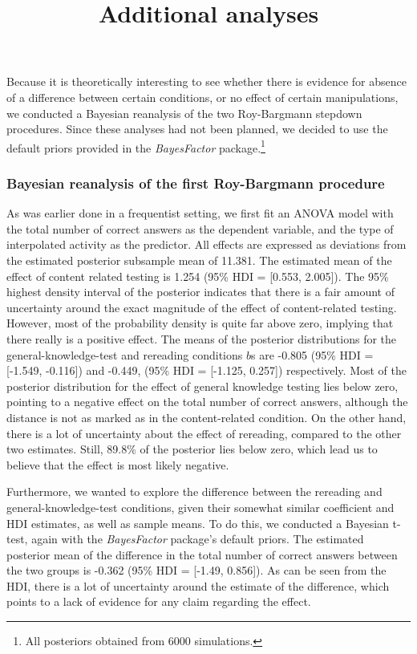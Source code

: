 \documentclass[11pt,]{article}
\title{Additional analyses}
\author{}
\date{}
\let\rmarkdownfootnote\footnote%
\def\footnote{\protect\rmarkdownfootnote}
\begin{document}
\maketitle

Because it is theoretically interesting to see whether there is evidence
for absence of a difference between certain conditions, or no effect of
certain manipulations, we conducted a Bayesian reanalysis of the two
Roy-Bargmann stepdown procedures. Since these analyses had not been
planned, we decided to use the default priors provided in the
\textit{BayesFactor} \citep{moreyBayesFactorComputationBayes2018}
package.\footnote{All posteriors obtained from 6000 simulations.}

\hypertarget{bayesian-reanalysis-of-the-first-roy-bargmann-procedure}{%
\subsubsection{Bayesian reanalysis of the first Roy-Bargmann
procedure}\label{bayesian-reanalysis-of-the-first-roy-bargmann-procedure}}

As was earlier done in a frequentist setting, we first fit an ANOVA
model with the total number of correct answers as the dependent
variable, and the type of interpolated activity as the predictor. All
effects are expressed as deviations from the estimated posterior
subsample mean of 11.381. The estimated mean of the effect of content
related testing is 1.254 (95\% HDI = {[}0.553, 2.005{]}). The 95\%
highest density interval of the posterior indicates that there is a fair
amount of uncertainty around the exact magnitude of the effect of
content-related testing. However, most of the probability density is
quite far above zero, implying that there really is a positive effect.
The means of the posterior distributions for the general-knowledge-test
and rereading conditions \(b\)s are -0.805 (95\% HDI = {[}-1.549,
-0.116{]}) and -0.449, (95\% HDI = {[}-1.125, 0.257{]}) respectively.
Most of the posterior distribution for the effect of general knowledge
testing lies below zero, pointing to a negative effect on the total
number of correct answers, although the distance is not as marked as in
the content-related condition. On the other hand, there is a lot of
uncertainty about the effect of rereading, compared to the other two
estimates. Still, 89.8\% of the posterior lies below zero, which lead us
to believe that the effect is most likely negative.

Furthermore, we wanted to explore the difference between the rereading
and general-knowledge-test conditions, given their somewhat similar
coefficient and HDI estimates, as well as sample means. To do this, we
conducted a Bayesian t-test, again with the \textit{BayesFactor}
package's default priors. The estimated posterior mean of the difference
in the total number of correct answers between the two groups is -0.362
(95\% HDI = {[}-1.49, 0.856{]}). As can be seen from the HDI, there is a
lot of uncertainty around the estimate of the difference, which points
to a lack of evidence for any claim regarding the effect.
\end{document}
